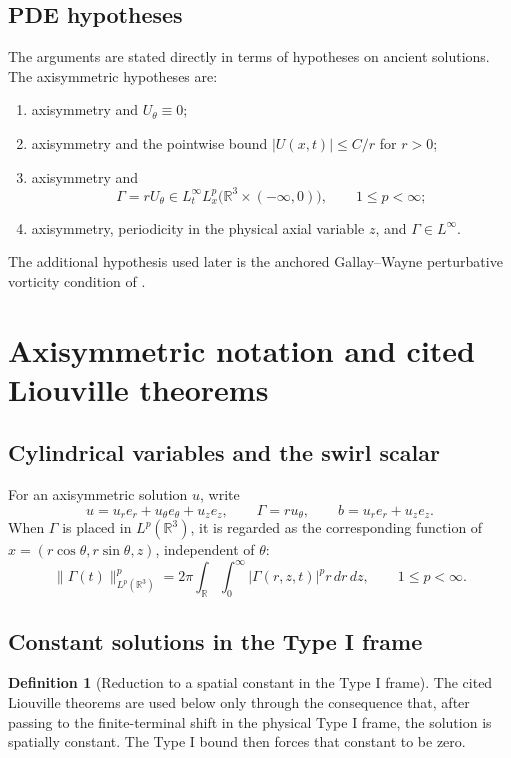 \documentclass[11pt]{amsart}
\theoremstyle{plain}
\theoremstyle{definition}
\newtheorem{definition}[definition]{Definition}
\theoremstyle{remark}
\numberwithin{equation}{section}
\begin{document}
\subsection{PDE hypotheses}

The arguments are stated directly in terms of hypotheses on ancient
solutions.  The axisymmetric hypotheses are:
\begin{enumerate}[label=\textup{(\roman*)}]
\item axisymmetry and \(U_\theta\equiv0\);
\item axisymmetry and the pointwise bound \(|U(x,t)|\le C/r\) for \(r>0\);
\item axisymmetry and
\[
   \Gamma=rU_\theta\in L_t^\infty L_x^p
   \bigl(\mathbb R^3\times(-\infty,0)\bigr),
   \qquad 1\le p<\infty;
\]
\item axisymmetry, periodicity in the physical axial variable \(z\), and
\(\Gamma\in L^\infty\).
\end{enumerate}
The additional hypothesis used later is the anchored Gallay--Wayne
perturbative vorticity condition of .

\section{Axisymmetric notation and cited Liouville theorems}
\label{p3:sec:axisymmetric-liouville-theorems}

\subsection{Cylindrical variables and the swirl scalar}

For an axisymmetric solution \(u\), write
\[
   u=u_re_r+u_\theta e_\theta+u_ze_z,\qquad
   \Gamma=ru_\theta,\qquad
   b=u_re_r+u_ze_z .
\]
When \(\Gamma\) is placed in \(L^p(\mathbb R^3)\), it is regarded as the
corresponding function of \(x=(r\cos\theta,r\sin\theta,z)\), independent of
\(\theta\):
\[
   \|\Gamma(t)\|_{L^p(\mathbb R^3)}^p
   =
   2\pi\int_{\mathbb R}\int_0^\infty
      |\Gamma(r,z,t)|^p r\,dr\,dz,\qquad 1\le p<\infty .
\]

\subsection{Constant solutions in the Type I frame}

\begin{definition}[Reduction to a spatial constant in the Type I frame]
The cited Liouville theorems are used below only through the consequence that,
after passing to the finite-terminal shift in the physical Type I frame, the
solution is spatially constant.  The Type I bound then forces that constant to
be zero.
\end{definition}
\end{document}
